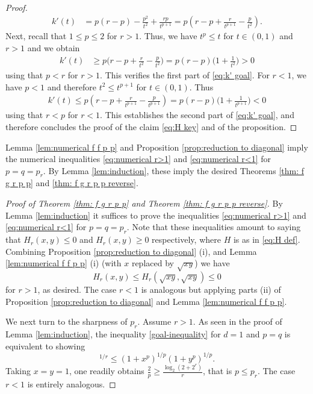 \documentclass[reqno, 10pt]{amsart}
\theoremstyle{plain}
\numberwithin{equation}{section}
\theoremstyle{definition}
\newtheorem*{induction hypothesis}{Induction hypothesis}
\theoremstyle{remark}
\begin{document}
\begin{proof}
\begin{align*}
    k'(t) &= p(r-p) - \frac{p^2}{t^2} + \frac{rp}{t^{p+1}} = p\left( r - p + \frac{r}{t^{p+1}} - \frac{p}{t^2} \right).
\end{align*}
Next, recall that $1 \leq p \leq 2$ for $r>1$. Thus, we have $t^p \leq t$ for  $t \in (0, 1)$ and $r>1$ and we obtain
\begin{align*}
    k'(t) 
    &\geq p \Big( r - p + \frac{r}{t^2} - \frac{p}{t^2} \Big) = p(r-p)\Big(1 + \frac{1}{t^2} \Big) > 0
\end{align*}
using that  $p < r$ for $r>1$. This verifies the first part of \eqref{eq:k' goal}. For $r<1$, we have $p<1$ and therefore $t^2 \leq t^{p+1}$ for $t \in (0,1)$. Thus
\begin{align*}
    k'(t)  \leq p\left(r-p+\frac{r}{t^{p+1}}-\frac{p}{t^{p+1}} \right)=p(r-p)\Big(1+\frac{1}{t^{p+1}}\Big)<0
\end{align*}
using that $r < p$ for $r <1$. This establishes the second part of \eqref{eq:k' goal}, and therefore concludes the proof of the claim \eqref{eq:H key} and of the proposition. 
\end{proof}

Lemma \ref{lem:numerical f f p p} and Proposition \ref{prop:reduction to diagonal} imply the numerical inequalities \eqref{eq:numerical r>1} and \eqref{eq:numerical r<1} for $p=q=p_r$. By Lemma \ref{lem:induction}, these imply the desired Theorems \ref{thm: f g r p p} and \ref{thm: f g r p p reverse}.

\begin{proof}[Proof of Theorem \ref{thm: f g r p p} and Theorem \ref{thm: f g r p p reverse}]
    By Lemma \ref{lem:induction} it suffices to prove the inequalities \eqref{eq:numerical r>1} and \eqref{eq:numerical r<1} for $p=q=p_r$. Note that these inequalities amount to saying that $H_r(x,y) \leq 0$ and $H_r(x,y) \geq 0$ respectively, where $H$ is as in \eqref{eq:H def}. Combining Proposition \ref{prop:reduction to diagonal} (i), and Lemma \ref{lem:numerical f f p p} (i) (with $x$ replaced by $\sqrt{xy}$) we have 
    \begin{equation*}
        H_r(x,y) \leq H_r(\sqrt{xy}, \sqrt{xy}) \leq 0
    \end{equation*}
    for $r >1$, as desired. 
    The case $r<1$ is analogous but applying parts (ii) of Proposition \ref{prop:reduction to diagonal} and Lemma \ref{lem:numerical f f p p}.

    We next turn to the sharpness of $p_r$. Assume $r>1$. As seen in the proof of Lemma \ref{lem:induction}, the inequality \eqref{goal-inequality} for $d=1$ and $p=q$ is equivalent to showing
    \begin{equation*}
    [1+(x+y)^r+(xy)^r]^{1/r}\leq (1+x^p)^{1/p}(1+y^p)^{1/p}.
    \end{equation*}
    Taking $x=y=1$, one readily obtains $\frac{2}{p} \geq \frac{\log_2(2+2^r)}{r}$, that is $p \leq p_r$. The case $r<1$ is entirely analogous.
\end{proof}
\end{document}
